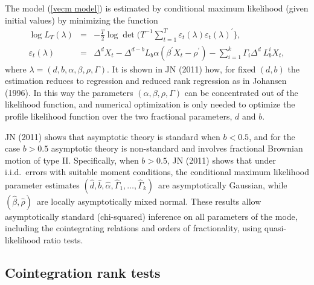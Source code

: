 \documentclass[12pt]{article}
\begin{document}
The model (\ref{vecm model}) is estimated by conditional maximum likelihood (given initial values) by minimizing the function
\begin{eqnarray}
\log L_{T}(\lambda ) &=&-\frac{T}{2}\log \det (T^{-1}\sum_{t=1}^{T}\varepsilon _{t}(\lambda )\varepsilon _{t}(\lambda)^{\prime }\},  \label{Cond Like} \\
\varepsilon _{t}(\lambda ) &=&\Delta^{d}X_{t}-\Delta^{d-b} L_{b} \alpha (\beta^{\prime} X_{t} -\rho^{\prime}) - \sum_{i=1}^{k}\Gamma_{i}\Delta^{d}\ L_{b}^{i}X_{t},  \label{epstau}
\end{eqnarray}%
where $\lambda =(d,b,\alpha ,\beta,\rho,\Gamma)$. It is shown in JN (2011) how, for fixed $(d,b)$ the estimation reduces to regression and reduced rank regression as in Johansen (1996). In this way the parameters $(\alpha ,\beta,\rho,\Gamma)$ can be concentrated out of the likelihood function, and numerical optimization is only needed to optimize the profile likelihood function over the two fractional parameters, $d$ and $b$.

JN (2011) shows that asymptotic theory is standard when $b<0.5$, and for the case $b>0.5$ 
asymptotic theory is non-standard and involves fractional Brownian motion of type II. 
Specifically, when $b>0.5$, JN (2011) shows that under i.i.d.\ errors with 
suitable moment conditions, the conditional maximum likelihood parameter estimates  
$(\hat{d},\hat{b},\hat{\alpha},\hat{\Gamma}_{1},\ldots,\hat{\Gamma}_{k})$\ 
are asymptotically Gaussian, while $(\hat{\beta},\hat{\rho})$\ are locally
asymptotically mixed normal. These results allow asymptotically standard
(chi-squared) inference on all parameters of the mode, including the
cointegrating relations and orders of fractionality, using quasi-likelihood ratio tests.

\subsection{Cointegration rank tests}
\end{document}
